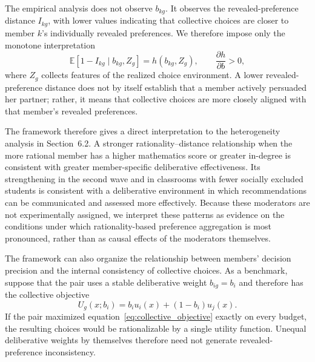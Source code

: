 \documentclass[11 pt]{article}
\begin{document}
The empirical analysis does not observe $b_{kg}$. It observes the revealed-preference distance $I_{kg}$, with lower values indicating that collective choices are closer to member $k$'s individually revealed preferences. We therefore impose only the monotone interpretation
\begin{equation}
    \mathbb{E}[1-I_{kg}\mid b_{kg},Z_g]=h(b_{kg},Z_g),
    \qquad \frac{\partial h}{\partial b}>0,
    \label{eq:distance_mapping}
\end{equation}
where $Z_g$ collects features of the realized choice environment. A lower revealed-preference distance does not by itself establish that a member actively persuaded her partner; rather, it means that collective choices are more closely aligned with that member's revealed preferences.

The framework therefore gives a direct interpretation to the heterogeneity analysis in Section~6.2. A stronger rationality--distance relationship when the more rational member has a higher mathematics score or greater in-degree is consistent with greater member-specific deliberative effectiveness. Its strengthening in the second wave and in classrooms with fewer socially excluded students is consistent with a deliberative environment in which recommendations can be communicated and assessed more effectively. Because these moderators are not experimentally assigned, we interpret these patterns as evidence on the conditions under which rationality-based preference aggregation is most pronounced, rather than as causal effects of the moderators themselves.

The framework can also organize the relationship between members' decision precision and the internal consistency of collective choices. As a benchmark, suppose that the pair uses a stable deliberative weight $b_{ig}=b_i$ and therefore has the collective objective
\begin{equation}
    U_g(x;b_i)=b_i u_i(x)+(1-b_i)u_j(x).
    \label{eq:collective_objective}
\end{equation}
If the pair maximized equation~\eqref{eq:collective_objective} exactly on every budget, the resulting choices would be rationalizable by a single utility function. Unequal deliberative weights by themselves therefore need not generate revealed-preference inconsistency.
\end{document}
